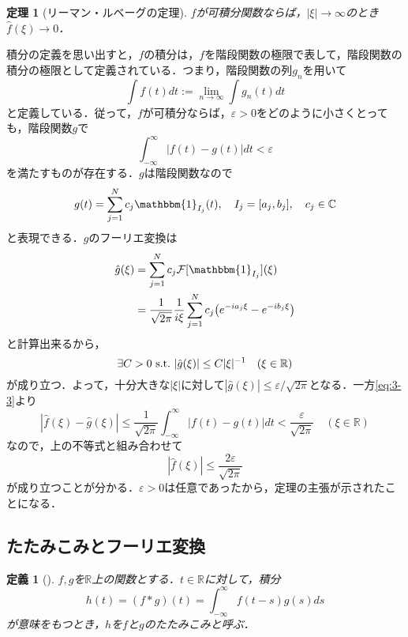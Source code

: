 \documentclass[dvipdfmx,a4j,10pt]{jsarticle}
\makeatletter
\theoremstyle{mystyle1}
\newtheorem{theorem}{定理}[section]
\theoremstyle{mystyle3}
\theoremstyle{mystyle4}
\theoremstyle{mystyle6}
\newtheorem{definition}{定義}[section]
\theoremstyle{mystyle2}
\theoremstyle{mystyle5}
\renewenvironment{proof}[1][\proofname]{\par
  \pushQED{\qed}%
  \normalfont
  \topsep6\p@\@plus6\p@ \trivlist
  \item[\hskip\labelsep{\bfseries\sffamily #1}]\ignorespaces
}{%
  \popQED\endtrivlist\@endpefalse
}
\renewcommand\proofname{証明}
\newenvironment{dfn}[1][]
{\begin{tcolorbox}[
    enhanced,
    boxrule=0pt,
    arc=0mm,
    frame hidden,
    borderline west={2pt}{-4pt}{green!60!black},
    breakable = true
    ]
    \begin{definition}[#1]
}
{\end{definition}\end{tcolorbox}}
\newenvironment{thm}[1][]
{\begin{tcolorbox}[
    enhanced,
    boxrule=0pt,
    arc=0mm,
    frame hidden,
    borderline west={2pt}{-4pt}{red},
    breakable = true
    ]
    \begin{theorem}[#1]
}
{\end{theorem}\end{tcolorbox}}
\makeatother
\begin{document}
\begin{thm}[リーマン・ルベーグの定理]\label{thm:3-12}
	$f$が可積分関数ならば，$|\xi|\to\infty$のとき$\hat f(\xi)\to 0$．
\end{thm}

\begin{proof}
	積分の定義を思い出すと，$f$の積分は，$f$を階段関数の極限で表して，階段関数の積分の極限として定義されている．つまり，階段関数の列$g_n$を用いて
	\begin{equation*}
		\int f(t)dt:=\lim_{n\to\infty}\int g_n(t)dt
	\end{equation*}
	と定義している．従って，$f$が可積分ならば，$\varepsilon>0$をどのように小さくとっても，階段関数$g$で
	\begin{equation}
		\int_{-\infty}^\infty|f(t)-g(t)|dt<\varepsilon \label{eq:3-3}
	\end{equation}
	を満たすものが存在する．$g$は階段関数なので
	\[
		g(t)=\sum_{j=1}^N c_j\mathbbm{1}_{I_j}(t),\quad I_j=[a_j, b_j],\quad c_j\in\mathbb{C}
	\]
	と表現できる．$g$のフーリエ変換は
	\[
		\begin{split}
			\hat{g}(\xi)&=\sum_{j=1}^N c_j\mathcal{F}[\mathbbm{1}_{I_j}](\xi) \\
			&=\frac{1}{\sqrt{2\pi}}\frac{1}{i\xi}\sum_{j=1}^N c_j\mleft(e^{-ia_j\xi}-e^{-ib_j\xi}\mright)
		\end{split}
	\]
	と計算出来るから，
	\[
		\exists C>0\ \mathrm{s.t.}\ \mleft|\hat{g}(\xi)\mright|\leq C|\xi|^{-1}\quad(\xi\in\mathbb{R})
	\]
	が成り立つ．よって，十分大きな$|\xi|$に対して$\displaystyle\left|\hat{g}(\xi)\right|\leq\varepsilon/\sqrt{2\pi}$となる．一方\eqref{eq:3-3}より
	\[
		\left|\hat{f}(\xi)-\hat{g}(\xi)\right|\leq\frac{1}{\sqrt{2\pi}}\int_{-\infty}^\infty|f(t)-g(t)|dt<\frac{\varepsilon}{\sqrt{2\pi}}\quad(\xi\in\mathbb{R})
	\]
	なので，上の不等式と組み合わせて
	\[
		\left|\hat{f}(\xi)\right|\leq\frac{2\varepsilon}{\sqrt{2\pi}}
	\]
	が成り立つことが分かる．$\varepsilon>0$は任意であったから，定理の主張が示されたことになる．
\end{proof}

\subsection{たたみこみとフーリエ変換}

\begin{dfn}\label{dfn:3-4}
	$f,g$を$\mathbb{R}$上の関数とする．$t\in\mathbb{R}$に対して，積分
	\[
		h(t)=(f*g)(t)=\int_{-\infty}^\infty f(t-s)g(s)ds
	\]
	が意味をもつとき，$h$を$f$と$g$のたたみこみと呼ぶ．
\end{dfn}
\end{document}
